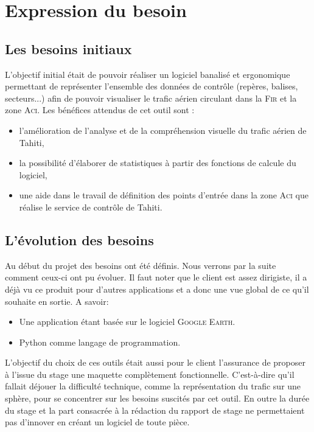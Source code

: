
\section{Expression du besoin\label{besoins}} 
    \subsection{Les besoins initiaux}
L’objectif initial était de pouvoir réaliser un logiciel banalisé et ergonomique permettant de
représenter l’ensemble des données de contrôle (repères, balises, secteurs...) afin de pouvoir
visualiser le trafic aérien circulant dans la \textsc{Fir} et la zone \textsc{Aci}.
Les bénéfices attendus de cet outil sont :
\begin{itemize}
\item l’amélioration de l’analyse et de la compréhension visuelle du trafic aérien de Tahiti,
\item la possibilité d’élaborer de statistiques à partir des fonctions de calcule du logiciel,
\item une aide dans le travail de définition des points d’entrée dans la zone \textsc{Aci} que réalise le
service de contrôle de Tahiti.
\end{itemize}\medskip

    \subsection{L’évolution des besoins}
Au début du projet des besoins ont été définis. Nous verrons par la suite comment ceux-ci ont pu évoluer. Il faut noter que le client est assez dirigiste, il a déjà vu ce produit pour d'autres applications et a donc une vue global de ce qu'il souhaite en sortie. A savoir:
\begin{itemize}
    \item Une application étant basée sur le logiciel \textsc{Google Earth}.
    \item Python comme langage de programmation.
\end{itemize}\medskip

L’objectif du choix de ces outils était aussi pour le client l’assurance de proposer à l’issue du stage une maquette complètement fonctionnelle. C'est-à-dire qu’il fallait déjouer la difficulté technique, comme la représentation du trafic sur une sphère, pour se concentrer sur les besoins suscités par cet outil. En outre la durée du stage et la part consacrée à la rédaction du rapport de stage ne permettaient pas d’innover en créant un logiciel de toute pièce.

